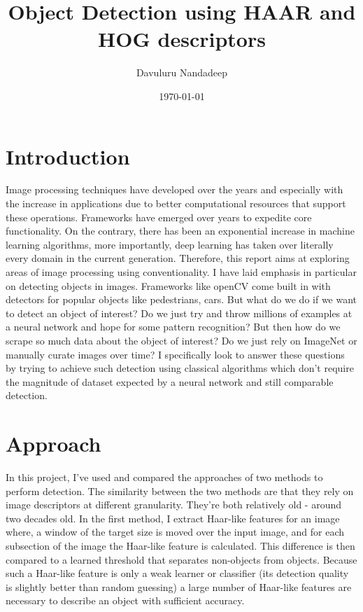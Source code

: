 \documentclass[%
 aip,
 jmp,%
 amsmath,amssymb,
 reprint,%
]{revtex4-1}
\begin{document}
\title[CS 510 Introduction to Visual Computing]{Object Detection using HAAR and HOG descriptors}%

\author{Davuluru Nandadeep}


\date{\today}%

\maketitle


\section{Introduction}
Image processing techniques have developed over the years and especially with the increase in applications due to better computational resources that support these operations. Frameworks have emerged over years to expedite core functionality. On the contrary, there has been an exponential increase in machine learning algorithms, more importantly, deep learning has taken over literally every domain in the current generation. Therefore, this report aims at exploring areas of image processing using conventionality. 
I have laid emphasis in particular on detecting objects in images. Frameworks like openCV come built in with detectors for popular objects like pedestrians, cars. But what do we do if we want to detect an object of interest? Do we just try and throw millions of examples at a neural network and hope for some pattern recognition? But then how do we scrape so much data about the object of interest? Do we just rely on ImageNet or manually curate images over time? I specifically look to answer these questions by trying to achieve such detection using classical algorithms which don't require the magnitude of dataset expected by a neural network and still comparable detection.

\section{Approach}
In this project, I've used and compared the approaches of two methods to perform detection. The similarity between the two methods are that they rely on image descriptors at different granularity. They're both relatively old - around two decades old. In the first method, I extract Haar-like features for an image where, a window of the target size is moved over the input image, and for each subsection of the image the Haar-like feature is calculated. This difference is then compared to a learned threshold that separates non-objects from objects. Because such a Haar-like feature is only a weak learner or classifier (its detection quality is slightly better than random guessing) a large number of Haar-like features are necessary to describe an object with sufficient accuracy. 
\end{document}
